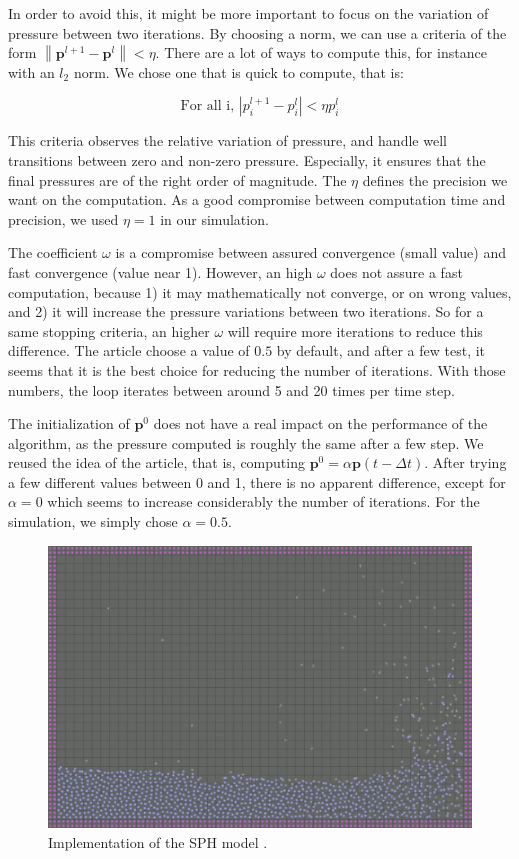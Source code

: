 \documentclass[acmtog, authorversion]{acmart}
\begin{document}
In order to avoid this, it might be more important to focus on the variation of pressure between two iterations. By choosing a norm, we can use a criteria of the form $\left\| \textbf{p}^{l+1} - \textbf{p}^l \right\| < \eta$.
There are a lot of ways to compute this, for instance with an $l_2$ norm. We chose one that is quick to compute, that is:

\begin{equation}
  \text{For all i, } \left| p_i^{l+1} - p_i^l \right| < \eta p_i^l
\end{equation}

This criteria observes the relative variation of pressure, and handle well transitions between zero and non-zero pressure. Especially, it ensures that the final pressures are of the right order of magnitude.
The $\eta$ defines the precision we want on the computation. As a good compromise between computation time and precision, we used $\eta = 1$ in our simulation.

The coefficient $\omega$ is a compromise between assured convergence (small value) and fast convergence (value near 1). However, an high $\omega$ does not assure a fast computation, because 1) it may mathematically not converge, or on wrong values,
and 2) it will increase the pressure variations between two iterations. So for a same stopping criteria, an higher $\omega$ will require more iterations to reduce this difference. The article choose a value of $0.5$ by default, and after a few test, it seems that it is the best choice for reducing the number of iterations.
With those numbers, the loop iterates between around 5 and 20 times per time step.

The initialization of $\textbf{p}^0$ does not have a real impact on the performance of the algorithm, as the pressure computed is roughly the same after a few step.
We reused the idea of the article, that is, computing $\textbf{p}^0 = \alpha\textbf{p}(t - \Delta t)$.
After trying a few different values between 0 and 1, there is no apparent difference, except for $\alpha = 0$ which seems to increase considerably the number of iterations.
For the simulation, we simply chose $\alpha = 0.5$.

\begin{figure}
  \centering
  \includegraphics[width=\linewidth]{SPH_wave.png}
  \caption{Implementation of the SPH model \cite{SPH}.}
  \label{fig:SPH}
\end{figure}
\end{document}
